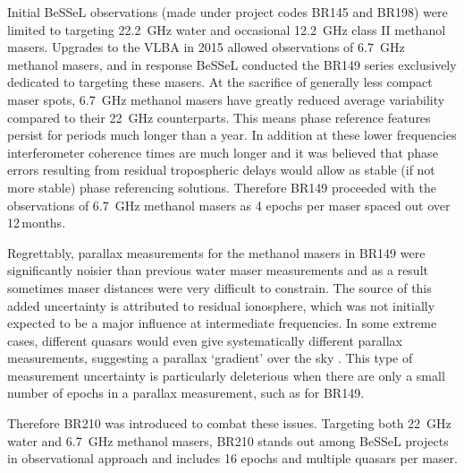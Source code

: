         Initial BeSSeL observations (made under project codes BR145 and BR198) were limited to targeting 22.2~GHz water and occasional 12.2~GHz class II methanol masers. Upgrades to the VLBA in 2015 allowed observations of 6.7~GHz methanol masers, and in response BeSSeL conducted the BR149 series exclusively dedicated to targeting these masers. At the sacrifice of generally less compact maser spots, 6.7~GHz methanol masers have greatly reduced average variability compared to their 22~GHz counterparts. This means phase reference features persist for periods much longer than a year. In addition at these lower frequencies interferometer coherence times are much longer and it was believed that phase errors resulting from residual tropospheric delays would allow as stable (if not more stable) phase referencing solutions. Therefore BR149 proceeded with the observations of 6.7~GHz methanol masers as 4 epochs per maser spaced out over 12\,months.
        
        Regrettably, parallax measurements for the methanol masers in BR149 were significantly noisier than previous water maser measurements and as a result sometimes maser distances were very difficult to constrain. The source of this added uncertainty is attributed to residual ionosphere, which was not initially expected to be a major influence at intermediate frequencies. In some extreme cases, different quasars would even give systematically different parallax measurements, suggesting a parallax `gradient' over the sky \citep{Reid2017,Zhang2019}. This type of measurement uncertainty is particularly deleterious when there are only a small number of epochs in a parallax measurement, such as for BR149. 
        
        Therefore BR210 was introduced to combat these issues. Targeting both 22~GHz water and 6.7~GHz methanol masers, BR210 stands out among BeSSeL projects in observational approach and includes 16 epochs and multiple quasars per maser. 
	    
